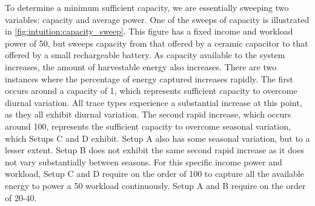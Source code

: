 To determine a minimum sufficient capacity, we are essentially sweeping two variables: capacity and average power.
One of the sweeps of capacity is illustrated in \cref{fig:intuition:capacity_sweep}. 
This figure has a fixed income and workload power of 50\ssi{\micro\watt}, but sweeps capacity from that offered by a ceramic capacitor to that offered by a small rechargeable battery.
As capacity available to the system increases, the amount of harvestable energy also increases.
There are two instances where the percentage of energy captured increases rapidly. The first occurs around a capacity of 1\ssi{\milli\Wh}, which represents sufficient capacity to overcome diurnal variation. All trace types experience a substantial increase at this point, as they all exhibit diurnal variation. 
The second rapid increase, which occurs around 100\ssi{\milli\Wh}, represents the sufficient capacity to overcome seasonal variation, which Setups C and D exhibit. Setup A also has some seasonal variation, but to a lesser extent. Setup B does not exhibit the same second rapid increase as it does not vary substantially between seasons.
For this specific income power and workload, Setup C and D require on the order of 100\ssi{\milli\Wh} to capture all the available energy to power a 50\ssi{\micro\watt} workload continuously. Setup A and B require on the order of 20-40\ssi{\milli\Wh}.


